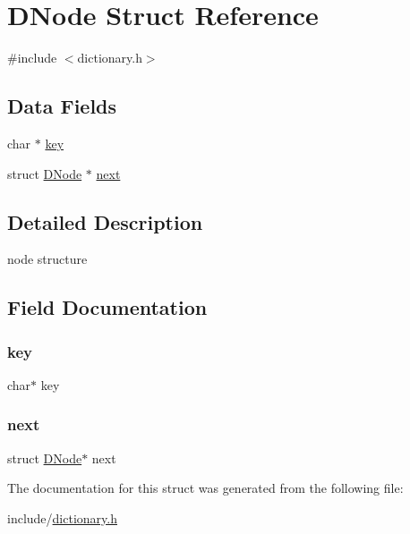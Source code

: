 \hypertarget{struct_d_node}{}\section{D\+Node Struct Reference}
\label{struct_d_node}


{\ttfamily \#include $<$dictionary.\+h$>$}

\subsection*{Data Fields}
\begin{DoxyCompactItemize}
\item 
char $\ast$ \hyperlink{struct_d_node_a5892a9181e6a332f84d27aecd41dcd12}{key}
\item 
struct \hyperlink{struct_d_node}{D\+Node} $\ast$ \hyperlink{struct_d_node_af9074932e8b0ad97eac38389ac1d9bfc}{next}
\end{DoxyCompactItemize}


\subsection{Detailed Description}
node structure 

\subsection{Field Documentation}
\mbox{\label{struct_d_node_a5892a9181e6a332f84d27aecd41dcd12}} 
\subsubsection{\texorpdfstring{key}{key}}
{\footnotesize\ttfamily char$\ast$ key}

\mbox{\label{struct_d_node_af9074932e8b0ad97eac38389ac1d9bfc}} 
\subsubsection{\texorpdfstring{next}{next}}
{\footnotesize\ttfamily struct \hyperlink{struct_d_node}{D\+Node}$\ast$ next}



The documentation for this struct was generated from the following file\+:\begin{DoxyCompactItemize}
\item 
include/\hyperlink{dictionary_8h}{dictionary.\+h}\end{DoxyCompactItemize}
